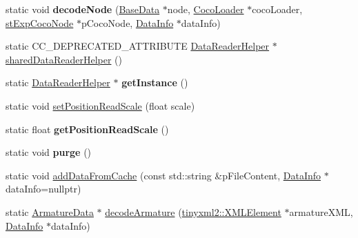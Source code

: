 \begin{DoxyCompactItemize}
\item 
\mbox{\label{classcocostudio_1_1DataReaderHelper_a191c40b80cb2ccb402f3e91424aac993}} 
static void {\bfseries decode\+Node} (\hyperlink{classcocostudio_1_1BaseData}{Base\+Data} $\ast$node, \hyperlink{classcocostudio_1_1CocoLoader}{Coco\+Loader} $\ast$coco\+Loader, \hyperlink{structcocostudio_1_1stExpCocoNode}{st\+Exp\+Coco\+Node} $\ast$p\+Coco\+Node, \hyperlink{structcocostudio_1_1DataReaderHelper_1_1__DataInfo}{Data\+Info} $\ast$data\+Info)
\item 
static C\+C\+\_\+\+D\+E\+P\+R\+E\+C\+A\+T\+E\+D\+\_\+\+A\+T\+T\+R\+I\+B\+U\+TE \hyperlink{classcocostudio_1_1DataReaderHelper}{Data\+Reader\+Helper} $\ast$ \hyperlink{classcocostudio_1_1DataReaderHelper_a9bb0d6d948d46a153a1d7cfe53e3c406}{shared\+Data\+Reader\+Helper} ()
\item 
\mbox{\label{classcocostudio_1_1DataReaderHelper_a73fdd3851484b9a99ba019491cc6bbb3}} 
static \hyperlink{classcocostudio_1_1DataReaderHelper}{Data\+Reader\+Helper} $\ast$ {\bfseries get\+Instance} ()
\item 
static void \hyperlink{classcocostudio_1_1DataReaderHelper_a55f3cd35a08c40c2c852de1c74608a34}{set\+Position\+Read\+Scale} (float scale)
\item 
\mbox{\label{classcocostudio_1_1DataReaderHelper_adbe69cfce656d79a3ff584486bb32040}} 
static float {\bfseries get\+Position\+Read\+Scale} ()
\item 
\mbox{\label{classcocostudio_1_1DataReaderHelper_a78fa9e915ff215a2dfd7594427802e83}} 
static void {\bfseries purge} ()
\item 
static void \hyperlink{classcocostudio_1_1DataReaderHelper_a232ea5d6542dee745c9e9b711c8f5c80}{add\+Data\+From\+Cache} (const std\+::string \&p\+File\+Content, \hyperlink{structcocostudio_1_1DataReaderHelper_1_1__DataInfo}{Data\+Info} $\ast$data\+Info=nullptr)
\item 
static \hyperlink{classcocostudio_1_1ArmatureData}{Armature\+Data} $\ast$ \hyperlink{classcocostudio_1_1DataReaderHelper_a5b20054132aa72382e5e3091dc51800d}{decode\+Armature} (\hyperlink{classtinyxml2_1_1XMLElement}{tinyxml2\+::\+X\+M\+L\+Element} $\ast$armature\+X\+ML, \hyperlink{structcocostudio_1_1DataReaderHelper_1_1__DataInfo}{Data\+Info} $\ast$data\+Info)

\end{DoxyCompactItemize}
